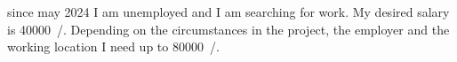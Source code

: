 \versionLanguageStart%
		since may 2024 I am unemployed and I am searching for work.
		My desired salary is \SI{40000}{\sieuro/\year}.
		Depending on the circumstances in the project, the employer and the working location I need up to \SI{80000}{\sieuro/\year}.
\versionLanguageEnd